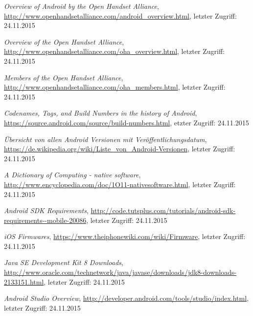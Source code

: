 \begin{thebibliography}{}

\emph{Overview of Android by the Open Handset Alliance},
\url{http://www.openhandsetalliance.com/android_overview.html}, letzter Zugriff: 24.11.2015

\emph{Overview of the Open Handset Alliance},
\url{http://www.openhandsetalliance.com/oha_overview.html}, letzter Zugriff: 24.11.2015

\emph{Members of the Open Handset Alliance},
\url{http://www.openhandsetalliance.com/oha_members.html}, letzter Zugriff: 24.11.2015

\emph{Codenames, Tags, and Build Numbers in the history of Android},
\url{https://source.android.com/source/build-numbers.html}, etzter Zugriff: 24.11.2015

\emph{Übersicht von allen Android Versionen mit Veröffentlichungsdatum},
\url{https://de.wikipedia.org/wiki/Liste_von_Android-Versionen}, letzter Zugriff: 24.11.2015

\emph{A Dictionary of Computing - native software},
\url{http://www.encyclopedia.com/doc/1O11-nativesoftware.html}, letzter Zugriff: 24.11.2015

\emph{Android SDK Requirements},
\url{http://code.tutsplus.com/tutorials/android-sdk-requirements--mobile-20086}, letzter Zugriff: 24.11.2015

\emph{iOS Firmwares},
\url{https://www.theiphonewiki.com/wiki/Firmware}, letzter Zugriff: 24.11.2015

\emph{Java SE Development Kit 8 Downloads},
\url{http://www.oracle.com/technetwork/java/javase/downloads/jdk8-downloads-2133151.html}, letzter Zugriff: 24.11.2015

\emph{Android Studio Overview},
\url{http://developer.android.com/tools/studio/index.html}, letzter Zugriff: 24.11.2015


\end{thebibliography}
